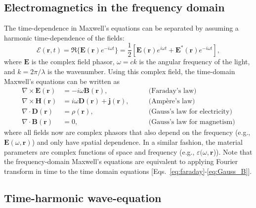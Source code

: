 \subsection*{Electromagnetics in the frequency domain}

The time-dependence in Maxwell's equations can be separated by assuming a
harmonic time-dependence of the fields:
\begin{equation}
    \bm{\mathcal{E}}(\mathbf{r}, t) = \Re \{ \mathbf{E}(\mathbf{r}) e^{-i\omega
            t} \}= \frac{1}{2}\left[ \mathbf{E}(\mathbf{r}) e^{i\omega t} +
        \mathbf{E}^*(\mathbf{r}) e^{-i\omega t}\right],
\end{equation}
where $\mathbf{E}$ is the complex field phasor, $\omega=ck$ is the angular
frequency of the light, and $k=2\pi/\lambda$ is the wavenumber.
Using this complex field, the time-domain Maxwell's equations can be written as
\begin{align}
    \nabla \times \mathbf{E}(\mathbf{r}) & = -i\omega \mathbf{B}(\mathbf{r}),
    \quad \quad                          & \text{(Faraday's law)} \label{eq:curlE_freq}                                   \\
    \nabla \times \mathbf{H}(\mathbf{r}) & = i\omega  \mathbf{D}(\mathbf{r}) +
    \mathbf{j}(\mathbf{r}), \quad \quad  & \text{(Ampère's law)}
    \label{eq:curlH_freq}                                                                                                 \\
    \nabla \cdot \mathbf{D}(\mathbf{r})  & = \rho(\mathbf{r}), \quad \quad
                                         & \text{(Gauss's law for electricity)} \label{eq:divD_freq}                      \\
    \nabla \cdot \mathbf{B}(\mathbf{r})  & = 0, \quad \quad                                          & \text{(Gauss's law
        for magnetism)} \label{eq:divB_freq}
\end{align}
where all fields now are complex phasors that also depend on the frequency
(e.g., $\mathbf{E}(\omega, \mathbf{r})$) and only have spatial dependence. In a
similar fashion,
the material parameters are complex functions of space and frequency (e.g.,
$\varepsilon(\omega, \mathbf{r}$)).
    Note that the frequency-domain Maxwell's equations are equivalent to applying
    Fourier transform in time to the time domain
    equations [Eqs.~\eqref{eq:faraday}-\eqref{eq:Gauss_B}].

    \subsection*{Time-harmonic wave-equation}

